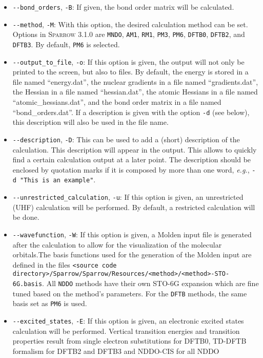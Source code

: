 \documentclass[]{tufte-book}
\begin{document}
\begin{itemize}
\item \texttt{-{}-bond\_orders}, \texttt{-B}: If given, the bond order matrix will be calculated.
\item \texttt{-{}-method}, \texttt{-M}: With this option, the desired calculation method can be set. Options in
\textsc{Sparrow} 3.1.0 are \texttt{MNDO}, \texttt{AM1}, \texttt{RM1}, \texttt{PM3}, \texttt{PM6}, \texttt{DFTB0}, \texttt{DFTB2}, and
\texttt{DFTB3}. By default, \texttt{PM6} is selected.
\item \texttt{-{}-output\_to\_file}, \texttt{-o}: If this option is given, the output will not only be printed to the screen, 
but also to files. By default, the energy is stored in a file named ``energy.dat'', the nuclear gradients in a file named
``gradients.dat'', the Hessian in a file named ``hessian.dat'', the atomic Hessians in a file named ``atomic\_hessians.dat'', and the
bond order matrix in a file named ``bond\_orders.dat''.
If a description is given with the option \texttt{-d} (see below), this description will also be used in the file name.
\item \texttt{-{}-description}, \texttt{-D}: This can be used to add a (short) description of the calculation. This
description will appear in the output. This allows to quickly find a certain calculation output at a later point. The
description should be enclosed by quotation marks if it is composed by more than one word, \textit{e.g.},
\texttt{-d "This is an example"}.
\item \texttt{-{}-unrestricted\_calculation}, \texttt{-u}: If this option is given, an unrestricted (UHF) calculation
will be performed. By default, a restricted calculation will be done.
\item \texttt{-{}-wavefunction}, \texttt{-W}: If this option is given, a Molden input file is generated after the
calculation to allow for the visualization of the molecular orbitals.The basis functions used for the generation of the
Molden input are defined in the files \texttt{<source code directory>/Sparrow/Sparrow/Resources/<method>/<method>-STO-6G.basis}.
All \texttt{NDDO} methods have their own STO-6G expansion which are fine tuned based on the method's parameters.
For the \texttt{DFTB} methods, the same basis set as \texttt{PM6} is used.
\item \texttt{-{}-excited\_states}, \texttt{-E}: If this option is given, an
  electronic excited states calculation will be performed. Vertical transition
    energies and transition properties result from single electron substitutions
    for DFTB0, TD-DFTB formalism for DFTB2 and DFTB3 and NDDO-CIS for all NDDO

\end{itemize}
\end{document}
